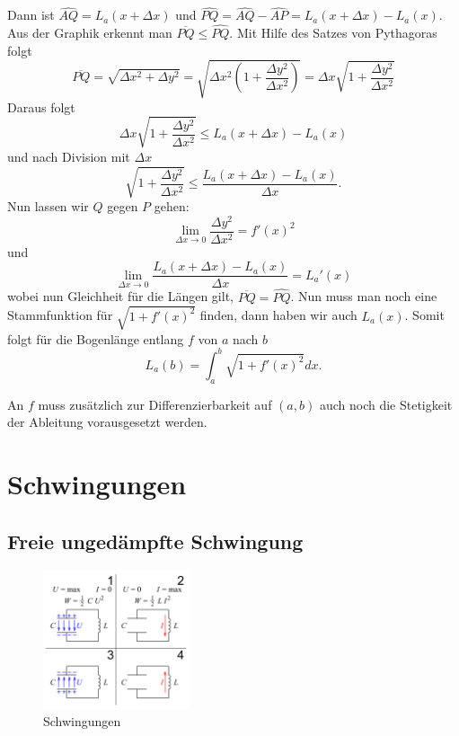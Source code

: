 \documentclass[%
draft,
11pt,%
twoside,%
titlepage,%
german,%
headsepline%
]{scrartcl}
\begin{document}
Dann ist $\hat{AQ}=L_a(x+\Delta x)$ und $\hat{PQ}=\hat{AQ}-\hat{AP}=L_a(x+\Delta x)-L_a(x)$. Aus der Graphik erkennt man $\overline{PQ}\leq\hat{PQ}$. Mit Hilfe des Satzes von Pythagoras folgt
$$
\overline{PQ} =\sqrt{\Delta x^2+\Delta y^2}=\sqrt{\Delta x^2\left(1+\frac{\Delta y^2}{\Delta x^2}\right)}=\Delta x\sqrt{1+\frac{\Delta y^2}{\Delta x^2}}
$$
Daraus folgt
$$\Delta x\sqrt{1+\frac{\Delta y^2}{\Delta x^2}}\leq L_a(x+\Delta x)-L_a(x)$$
und nach Division mit $\Delta x$
$$\sqrt{1+\frac{\Delta y^2}{\Delta x^2}}\leq\frac{L_a(x+\Delta x)-L_a(x)}{\Delta x}.$$
Nun lassen wir $Q$ gegen $P$ gehen:
$$\lim_{\Delta x\to0}\frac{\Delta y^2}{\Delta x^2}=f'(x)^2$$
und
$$\lim_{\Delta x\to0}\frac{L_a(x+\Delta x)-L_a(x)}{\Delta x}=L_a'(x)$$
wobei nun Gleichheit f\"ur die L\"angen gilt,  $\overline{PQ}=\hat{PQ}$.
Nun muss man noch eine Stammfunktion f\"ur $\sqrt{1+f'(x)^2}$ finden, dann haben wir auch $L_a(x)$. Somit folgt f\"ur die Bogenl\"ange entlang $f$ von $a$ nach $b$
$$L_a(b)=\int_a^b\sqrt{1+f'(x)^2}dx.$$
\begin{bem}
An $f$ muss zus\"atzlich zur Differenzierbarkeit auf $(a,b)$ auch noch die Stetigkeit der Ableitung vorausgesetzt werden.
\end{bem}

\section{Schwingungen}
\subsection{Freie unged\"ampfte Schwingung}

\begin{figure}
\vspace{20pt}
  \begin{center}
    \includegraphics[width=0.382\textwidth]{pictures/schwing}
  \end{center}
\caption{Schwingungen}
\vspace{-50pt}
\end{figure}
\end{document}
